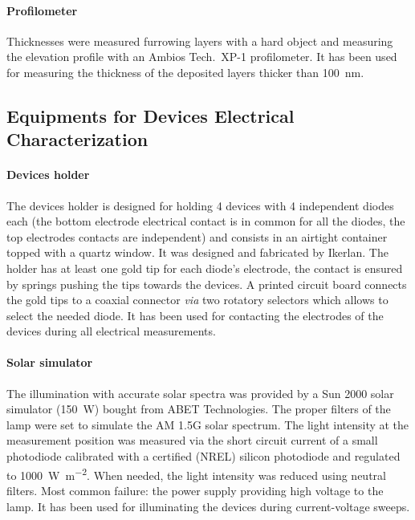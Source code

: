 		\paragraph{Profilometer}
		Thicknesses were measured furrowing layers with a hard object and measuring the elevation profile with an Ambios Tech.\ XP-1 profilometer.
		It has been used for measuring the thickness of the deposited layers thicker than \SI{100}{\nm}.

	\subsection{Equipments for Devices Electrical Characterization}

		\paragraph{Devices holder}
		The devices holder is designed for holding 4 devices with 4 independent diodes each (the bottom electrode electrical contact is in common for all the diodes, the top electrodes contacts are independent) and consists in an airtight container topped with a quartz window.
		It was designed and fabricated by Ikerlan.
		The holder has at least one gold tip for each diode's electrode, the contact is ensured by springs pushing the tips towards the devices.
		A printed circuit board connects the gold tips to a coaxial connector \textsl{via} two rotatory selectors which allows to select the needed diode.
		It has been used for contacting the electrodes of the devices during all electrical measurements.

		\paragraph{Solar simulator}\label{solarsimulator}
		The illumination with accurate solar spectra was provided by a Sun 2000 solar simulator (\SI{150}{\W}) bought from ABET Technologies.
		The proper filters of the lamp were set to simulate the AM 1.5G solar spectrum.
		The light intensity at the measurement position was measured via the short circuit current of a small photodiode calibrated with a certified (NREL) silicon photodiode and regulated to \SI{1000}{\W\per\m\squared}.
		When needed, the light intensity was reduced using neutral filters.
		Most common failure: the power supply providing high voltage to the lamp.
		It has been used for illuminating the devices during current-voltage sweeps.

